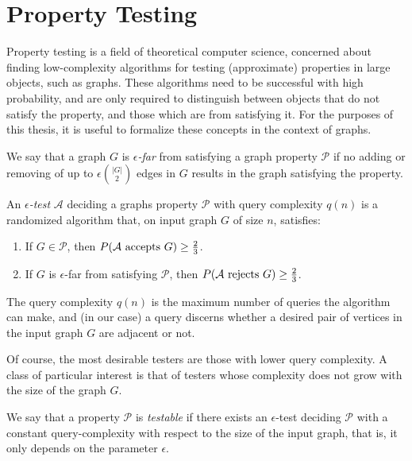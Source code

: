 \section{Property Testing} \label{sec:section_6}

    Property testing is a field of theoretical computer science, concerned about finding low-complexity algorithms
    for testing (approximate) properties in large objects, such as graphs.
    These algorithms need to be successful with high probability, and are only required to distinguish between objects
    that do not satisfy the property, and those which are  from satisfying it.
    For the purposes of this thesis, it is useful to formalize these concepts in the context of graphs.

    \begin{definition}
        We say that a graph $G$ is \emph{$\epsilon$-far} from satisfying a graph property $\mathcal{P}$ if no adding or
        removing of up to $\epsilon {|G| \choose 2}$ edges in $G$ results in the graph satisfying the property.
    \end{definition}

    \begin{definition} \label{def:epsilon_test}
        An \emph{$\epsilon$-test} $\mathcal{A}$ deciding a graphs property $\mathcal{P}$ with query complexity
        $q(n)$ is a randomized algorithm that, on input graph $G$ of size $n$,
        satisfies:
        \begin{enumerate}
            \item If $G \in \mathcal{P}$, then $P( \mathcal{A} \text{ accepts } G ) \geq \frac{2}{3}$.
            \item If $G$ is $\epsilon$-far from satisfying $\mathcal{P}$,
                then $P( \mathcal{A} \text{ rejects } G ) \geq \frac{2}{3}$.
        \end{enumerate}
        The query complexity $q(n)$ is the maximum number of queries the algorithm can make, and (in our case)
        a query discerns whether a desired pair of vertices in the input graph $G$ are adjacent or not.
    \end{definition}

    Of course, the most desirable testers are those with lower query complexity.
    A class of particular interest is that of testers whose complexity does not grow with the size of the
    graph $G$.

    \begin{definition}
        We say that a property $\mathcal{P}$ is \emph{testable} if there exists an $\epsilon$-test deciding $\mathcal{P}$
        with a constant query-complexity with respect to the size of the input graph, that is, it only depends on the
        parameter $\epsilon$.
    \end{definition}

